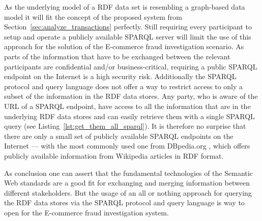 As the underlying model of a \gls{RDF} data set is resembling a graph-based data model it will fit the concept of the proposed system from Section~\ref{sec:analyze_transactions} perfectly. Still requiring every participant to setup and operate a publicly available \gls{SPARQL} server will limit the use of this approach for the solution of the \gls{E-commerce} fraud investigation scenario. As parts of the information that have to be exchanged between the relevant participants are confidential and/or business-critical, requiring a public \gls{SPARQL} endpoint on the Internet is a high security risk. Additionally the \gls{SPARQL} protocol and query language does not offer a way to restrict access to only a subset of the information in the \gls{RDF} data stores. Any party, who is aware of the \gls{URL} of a \gls{SPARQL} endpoint, have access to all the information that are in the underlying \gls{RDF} data stores and can easily retrieve them with a single \gls{SPARQL} query (see Listing~\ref{lst:get_them_all_sparql}). It is therefore no surprise that there are only a small set of publicly available \gls{SPARQL} endpoints on the Internet --- with the most commonly used one from DBpedia.org \citep{dbPedia.org}, which offers publicly available information from Wikipedia articles in \gls{RDF} format. \@


As conclusion one can assert that the fundamental technologies of the Semantic Web standards are a good fit for exchanging and merging information between different stakeholders. But the usage of an all or nothing approach for querying the \gls{RDF} data stores via the \gls{SPARQL} protocol and query language is way to open for the \gls{E-commerce} fraud investigation system.


